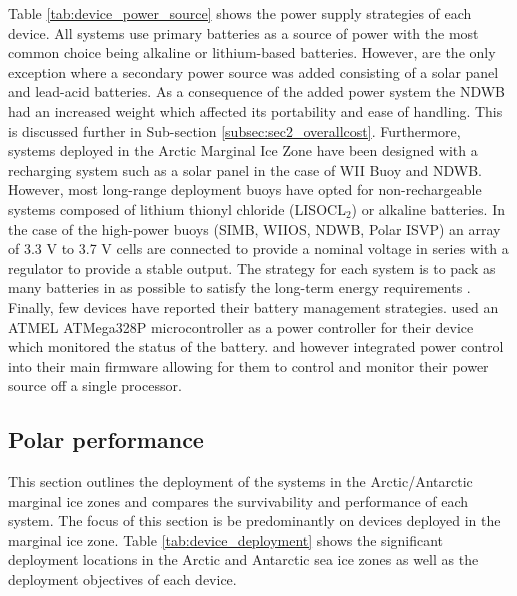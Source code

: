 Table \ref{tab:device_power_source} shows the power supply strategies of each device. All systems use primary batteries as a source of power with the most common choice being alkaline or lithium-based batteries. However, \textcite{doble2017robust} are the only exception where a secondary power source was added consisting of a solar panel and lead-acid batteries. As a consequence of the added power system the NDWB had an increased weight which affected its portability and ease of handling. This is discussed further in Sub-section \ref{subsec:sec2_overallcost}. Furthermore, systems deployed in the Arctic Marginal Ice Zone have been designed with a recharging system such as a solar panel in the case of WII Buoy and NDWB. However, most long-range deployment buoys have opted for non-rechargeable systems composed of lithium thionyl chloride (LISOCL$_2$) or alkaline batteries. In the case of the high-power buoys (SIMB, WIIOS, NDWB, Polar ISVP) an array of 3.3 V to 3.7 V cells are connected to provide a nominal voltage in series with a regulator to provide a stable output. The strategy for each system is to pack as many batteries in as possible to satisfy the long-term energy requirements \cite{doble2017robust,rabault2019open}. Finally, few devices have reported their battery management strategies. \textcite{rabault2019open} used an ATMEL ATMega328P microcontroller as a power controller for their device which monitored the status of the battery. \textcite{trident} and \textcite{kohout2015device} however integrated power control into their main firmware allowing for them to control and monitor their power source off a single processor.

\subsection{Polar performance}

This section outlines the deployment of the systems in the Arctic/Antarctic marginal ice zones and compares the survivability and performance of each system. The focus of this section is be predominantly on devices deployed in the marginal ice zone. Table \ref{tab:device_deployment} shows the significant deployment locations in the Arctic and Antarctic sea ice zones as well as the deployment objectives of each device. 

